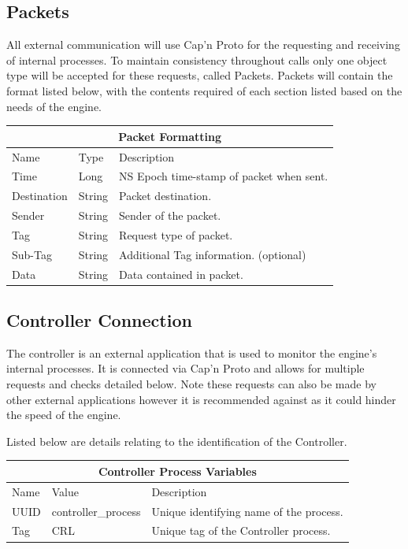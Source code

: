 \documentclass{article}
\begin{document}
\subsection{Packets}
All external communication will use Cap'n Proto for the requesting and receiving of internal processes. To maintain consistency throughout calls only one object type will be accepted for these requests, called Packets. Packets will contain the format listed below, with the contents required of each section listed based on the needs of the engine.

\begin{center}
\begin{tabular}{ | p{3cm} || p{3cm} | p{9cm} | }
\hline
\multicolumn{3}{|c|}{Packet Formatting}\\
\hline
Name & Type & Description\\
\hline
Time & Long & NS Epoch time-stamp of packet when sent.\\
Destination & String & Packet destination.\\
Sender & String & Sender of the packet.\\
Tag & String & Request type of packet.\\
Sub-Tag & String & Additional Tag information. (optional)\\
Data & String & Data contained in packet.\\
\hline
\end{tabular}
\end{center}

\subsection{Controller Connection}
The controller is an external application that is used to monitor the engine's internal processes. It is connected via Cap'n Proto and allows for multiple requests and checks detailed below. Note these requests can also be made by other external applications however it is recommended against as it could hinder the speed of the engine.

Listed below are details relating to the identification of the Controller.

\begin{center}
\begin{tabular}{ | p{5cm} || p{4cm} | p{6cm} | }
\hline
\multicolumn{3}{|c|}{Controller Process Variables}\\
\hline
Name & Value & Description\\
\hline
UUID & controller\_process & Unique identifying name of the process.\\
\hline
Tag & CRL & Unique tag of the Controller process.\\
\hline
\end{tabular}
\end{center}
\end{document}

